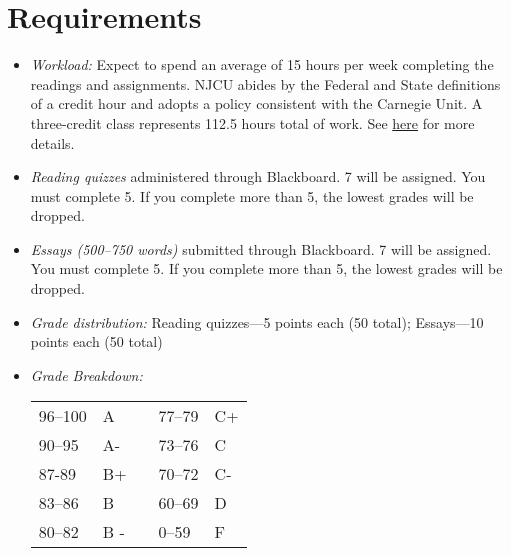 \documentclass[article,oneside]{memoir}
\begin{document}
\section{Requirements}

\begin{itemize}
\item \textit{Workload:} Expect to spend an average of 15 hours per week completing the readings and assignments. NJCU abides by the Federal and State definitions of a credit hour and adopts a policy consistent with the Carnegie Unit. A three-credit class represents 112.5 hours total of work. See \href{http://scottoconnor.org/resources/Credit.pdf}{here} for more details.


\item \textit{Reading quizzes} administered through Blackboard. 7  will be assigned. You must complete 5. If you complete more than 5, the lowest grades will be dropped. 

\item \textit{Essays (500--750 words)} submitted through Blackboard.  7 will be assigned. You must complete 5. If you complete more than 5, the lowest grades will be dropped. 


  
\item \textit{Grade distribution:} Reading quizzes---5 points each (50 total);  Essays---10 points each (50 total)


\item \textit{Grade Breakdown:}

 \begin{tabular}{ | l | l | p{2cm} | l | l | }
    \hline 
96--100 & A  & &  77--79 &  C+ \\  
90--95 & A- & &  73--76 & C \\
87-89 & B+ &  &  70--72 & C- \\ 
83--86 & B  & &  60--69 & D\\
80--82 & B - & & 0--59 & F\\ \hline
    \end{tabular}


\end{itemize}
\end{document}

